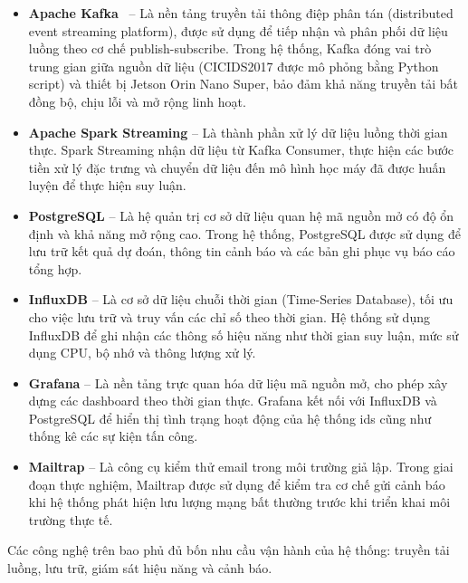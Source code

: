 \begin{itemize}

    \item \textbf{Apache Kafka}~\cite{kreps2011kafka} -- Là nền tảng truyền tải thông điệp phân tán (distributed event streaming platform), được sử dụng để tiếp nhận và phân phối dữ liệu luồng theo cơ chế publish-subscribe. Trong hệ thống, Kafka đóng vai trò trung gian giữa nguồn dữ liệu (CICIDS2017 được mô phỏng bằng Python script) và thiết bị Jetson Orin Nano Super, bảo đảm khả năng truyền tải bất đồng bộ, chịu lỗi và mở rộng linh hoạt.

    \item \textbf{Apache Spark Streaming} -- Là thành phần xử lý dữ liệu luồng thời gian thực. Spark Streaming nhận dữ liệu từ Kafka Consumer, thực hiện các bước tiền xử lý đặc trưng và chuyển dữ liệu đến mô hình học máy đã được huấn luyện để thực hiện suy luận.

    \item \textbf{PostgreSQL} -- Là hệ quản trị cơ sở dữ liệu quan hệ mã nguồn mở có độ ổn định và khả năng mở rộng cao. Trong hệ thống, PostgreSQL được sử dụng để lưu trữ kết quả dự đoán, thông tin cảnh báo và các bản ghi phục vụ báo cáo tổng hợp.

    \item \textbf{InfluxDB} -- Là cơ sở dữ liệu chuỗi thời gian (Time-Series Database), tối ưu cho việc lưu trữ và truy vấn các chỉ số theo thời gian. Hệ thống sử dụng InfluxDB để ghi nhận các thông số hiệu năng như thời gian suy luận, mức sử dụng CPU, bộ nhớ và thông lượng xử lý.

    \item \textbf{Grafana} -- Là nền tảng trực quan hóa dữ liệu mã nguồn mở, cho phép xây dựng các dashboard theo thời gian thực. Grafana kết nối với InfluxDB và PostgreSQL để hiển thị tình trạng hoạt động của hệ thống \ac{ids} cũng như thống kê các sự kiện tấn công.

    \item \textbf{Mailtrap} -- Là công cụ kiểm thử email trong môi trường giả lập. Trong giai đoạn thực nghiệm, Mailtrap được sử dụng để kiểm tra cơ chế gửi cảnh báo khi hệ thống phát hiện lưu lượng mạng bất thường trước khi triển khai môi trường thực tế.

\end{itemize}

Các công nghệ trên bao phủ đủ bốn nhu cầu vận hành của hệ thống: truyền tải luồng, lưu trữ, giám sát hiệu năng và cảnh báo.

